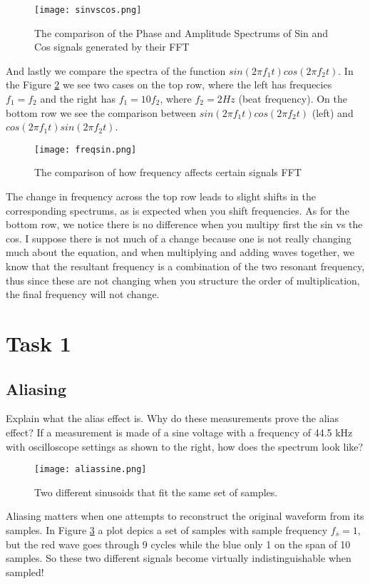 \documentclass{article}
\begin{document}
\begin{figure}[h]
  \centering
  \texttt{[image: sinvscos.png]}
  \caption{The comparison of the Phase and Amplitude Spectrums of Sin and Cos signals generated by their FFT}
  \label{sinvscos}
\end{figure}

And lastly we compare the spectra of the function $sin(2\pi f_1 t)cos(2\pi f_2 t)$. In the Figure \ref{freqsine} we see two cases on the top row, where the left has frequecies $f_1= f_2$ and the right has $f_1 = 10f_2$, where $f_2 = 2Hz$ (beat frequency). On the bottom row we see the comparison between $sin(2\pi f_1 t)cos(2\pi f_2 t)$ (left) and $cos(2\pi f_1 t)sin(2\pi f_2 t)$.

\begin{figure}[h]
  \centering
  \texttt{[image: freqsin.png]}
  \caption{The comparison of how frequency affects certain signals FFT}
  \label{freqsine}
\end{figure}
The change in frequency across the top row leads to slight shifts in the corresponding spectrums, as is expected when you shift frequencies.  As for the bottom row, we notice there is no difference when you multipy first the sin vs the cos. I suppose there is not much of a change because one is not really changing much about the equation, and when multiplying and adding waves together, we know that the resultant frequency is a combination of the two resonant frequency, thus since these are not changing when you structure the order of multiplication, the final frequency will not change.
\section{Task 1}
\subsection{Aliasing}
Explain what the alias effect is. Why do these measurements prove the alias effect? If a measurement is made of a sine voltage with a frequency of 44.5 kHz with oscilloscope settings as shown to the right, how does the spectrum look like?
\begin{figure}[h]
  \centering
  \texttt{[image: aliassine.png]}
  \caption[scale=0.5]{Two different sinusoids that fit the same set of samples.}
  \label{aliassine}
\end{figure}
Aliasing matters when one attempts to reconstruct the original waveform from its samples.
In Figure \ref{aliassine} a plot depics a set of samples with sample frequency $f_s =1$, but the red wave goes through 9 cycles while the blue only 1 on the span of 10 samples. So these two different signals become virtually indistinguishable when sampled!
\end{document}
